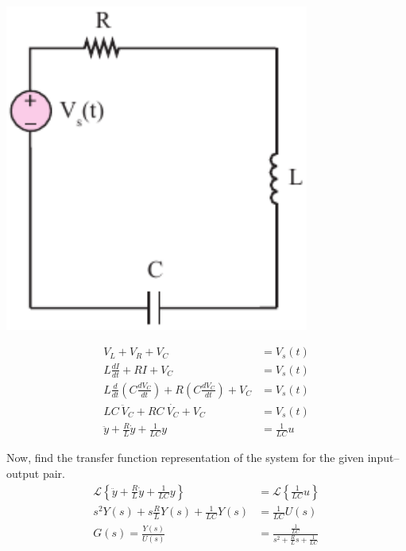 \documentclass[twoside]{article}
\begin{document}
  \begin{minipage}[h]{0.5\linewidth}
    \begin{center}
      \includegraphics[width=0.75\textwidth]{RLC}
    \end{center}
  \end{minipage}
  \begin{minipage}[h]{0.5\linewidth}
    \begin{center}
    {\large
  \begin{align*}
  	V_L + V_R + V_C &= V_s(t)
	\\
	L \frac{d I}{dt} + R I + V_C &= V_s(t)
	\\
	L \frac{d }{dt} \left( C \frac{d V_C}{dt} \right) + R  \left( C \frac{d V_C}{dt} \right) + V_C &= V_s(t)
	\\
	LC \ \ddot{V}_C + RC \ \dot{V_C} + V_C &= V_s(t)
	\\
	\ddot{y} + \frac{R}{L} \dot{y} + \frac{1}{LC} y &= \frac{1}{LC} u
  \end{align*}
  }
    \end{center}
  \end{minipage}

Now, find the transfer function representation of the system for the given input--output pair.
%
\begin{align*}
	\mathcal{L} \left\lbrace \ddot{y} + \frac{R}{L} \dot{y} + \frac{1}{LC} y  \right\rbrace 
	&= \mathcal{L} \left\lbrace \frac{1}{LC} u  \right\rbrace
	\\
	s^2 Y(s) + s \frac{R}{L} Y(s) + \frac{1}{LC} Y(s) &=  \frac{1}{LC} U(s) \\
	G(s) = \frac{Y(s)}{U(s)} &= \frac{\frac{1}{LC} }{s^2 + \frac{R}{L} s + \frac{1}{LC} }
\end{align*}
\end{document}
